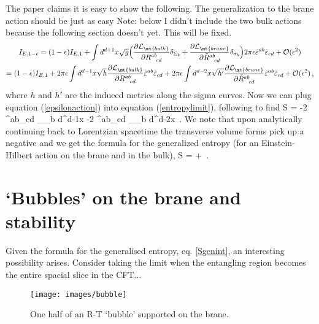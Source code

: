 The paper \cite{Myers:2010tj} claims it is easy to show the following. The generalization to the brane action should be just as easy Note: below I didn't include the two bulk actions because the following section doesn't yet. This will be fixed.
\begin{multline}\label{epsilonaction}
I_{E,1-\epsilon} = (1-\epsilon)I_{E,1} + \int d^{d+1}x \sqrt{g} \Big(\frac{\partial \mathcal{L}_\mt{bulk}}{\partial R^{ab}_{\,\,\,\,\,cd}}\delta_{\Sigma_b} + \frac{\partial \mathcal{L}_\mt{brane}}{\partial \tilde{R}^{ab}_{\,\,\,\,\,cd}}\delta_{\sigma_b}\Big)2\pi \epsilon \tilde{\varepsilon}^{ab}\tilde{\varepsilon}_{cd}+\mathcal{O}(\epsilon^2)\\
=(1-\epsilon)I_{E,1} + 2\pi \epsilon\int d^{d-1}x \sqrt{h}\frac{\partial \mathcal{L}_\mt{bulk}}{\partial R^{ab}_{\,\,\,\,\,cd}} \tilde{\varepsilon}^{ab}\tilde{\varepsilon}_{cd}+ 2\pi \epsilon\int d^{d-2}x \sqrt{h'}\frac{\partial \mathcal{L}_\mt{brane}}{\partial \tilde{R}^{ab}_{\,\,\,\,\,cd}} \tilde{\varepsilon}^{ab}\tilde{\varepsilon}_{cd}+\mathcal{O}(\epsilon^2)\,,
\end{multline} where $h$ and $h'$ are the induced metrics along the sigma curves.
Now we can plug equation (\ref{epsilonaction}) into equation (\ref{entropylimit}), following \cite{Myers:2010tj} to find
\beq
S = -2\pi {} \tilde{\varepsilon}^{ab}\tilde{\varepsilon}_{cd} \int_{\Sigma_b} d^{d-1}x -2\pi {} \tilde{\varepsilon}^{ab}\tilde{\varepsilon}_{cd} \int_{\sigma_b} d^{d-2}x \,.
\eeq We note that upon analytically continuing back to Lorentzian spacetime the transverse volume forms pick up a negative and we get the formula for the generalized entropy (for an Einstein-Hilbert action on the brane and in the bulk),
\beq
S = + \,.
\eeq

\section{`Bubbles' on the brane and stability}\label{sec:bubbles}

Given the formula for the generalised entropy, eq. \eqref{Sgenint}, an interesting possibility arises. Consider taking the limit when the entangling region becomes the entire spacial slice in the CFT...

\begin{figure}[h]
\begin{center}
\texttt{[image: images/bubble]} 
\caption{One half of an R-T `bubble' supported on the brane. }
\label{figbubble}
\end{center}
\end{figure}

